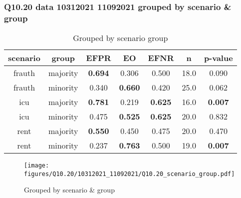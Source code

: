 \subsubsection{Q10.20 data 10312021 11092021 grouped by scenario \& group}

\begin{comment}
                        EFPR        EO   EFNR     n    pvalue
(frauth, majority)  0.694444  0.305556  0.500  18.0  0.089922
(frauth, minority)  0.340000  0.660000  0.420  25.0  0.061931
(icu, majority)     0.781250  0.218750  0.625  16.0  0.007119
(icu, minority)     0.475000  0.525000  0.625  20.0  0.832345
(rent, majority)    0.550000  0.450000  0.475  20.0  0.469684
(rent, minority)    0.236842  0.763158  0.500  19.0  0.006796
\end{comment}

\begin{table}[h]
    \centering
    \begin{tabular}{|c|c|c|c|c|c|c|}
        \hline
        scenario & group & EFPR & EO & EFNR & n & p-value\\
        \hline
        frauth & majority & \textbf{0.694} & 0.306 & 0.500 & 18.0 & 0.090\\
		frauth & minority & 0.340 & \textbf{0.660} & 0.420 & 25.0 & 0.062\\
		icu & majority & \textbf{0.781} & 0.219 & \textbf{0.625} & 16.0 & \textbf{0.007}\\
		icu & minority & 0.475 & \textbf{0.525} & \textbf{0.625} & 20.0 & 0.832\\
		rent & majority & \textbf{0.550} & 0.450 & 0.475 & 20.0 & 0.470\\
		rent & minority & 0.237 & \textbf{0.763} & 0.500 & 19.0 & \textbf{0.007}\\
		
        \hline
    \end{tabular}
    \caption{Grouped by scenario group}
    \label{tab:my_label}
\end{table}
\begin{figure}[h]
    \centering
    \texttt{[image: figures/Q10.20/10312021\_11092021/Q10.20\_scenario\_group.pdf]}
    \caption{Grouped by scenario \& group}
    \label{fig:my_label}
\end{figure}
